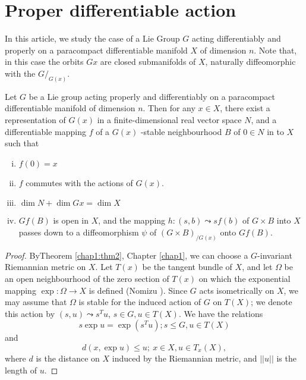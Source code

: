 \section{Proper differentiable action}%
 
In this article, we study the case of  a Lie Group $G$ acting
differentiably and properly on a  paracompact differentiable manifold
$X$ of dimension $n$. Note that, in this case the  orbits $Gx$ are
closed  submanifolds of $X$, naturally diffeomorphic with the $G/_{G
  (x) }$. 

\begin{lem}\label{chap2:lem4}%
  Let $G$ be a Lie group acting properly and differentiably on a
  paracompact differentiable manifold of dimension $n$. Then for any $x \in X
  $, there exist a representation of $G(x)$ in a finite-dimensional real
  vector space $N$, and a differentiable mapping $f$ of a $G (x)$
  -stable neighbourhood $B$ of  $ 0 \in N $ in to $X$ such that  
  \begin{enumerate}[(i)]
  \item $f (0) = x$

  \item $f$ commutes with the actions of $G(x)$.

  \item $\dim N +  \dim  Gx = \dim X$

  \item $ G f (B) $ is open in $X$, and  the mapping $h : (s, b)
    \leadsto  sf (b)$ of  $ G \times B $ into $X$ passes down to  a
    diffeomorphism $\psi$ of $(G \times B)_{/  G (x)}$ onto $G f (B)$. 
  \end{enumerate}  
\end{lem}  
 
\begin{proof}
  By\pageoriginale Theorem \ref{chap1:thm2}, Chapter \ref{chap1}, we
  can choose a $G$-invariant   Riemannian  
  metric on $X$. Let $T(x)$ be the tangent bundle of $X$, and  let
  $\Omega $ be an  open neighbourhood of the zero section of $T(x)$ on
  which the exponential mapping  $ \exp : \Omega \rightarrow  X $  is
  defined  (Nomizu \cite{key1}). Since  $G$ acts  isometrically on  $X$,
  we may assume that $\Omega $ is stable for the induced action of $G$
  on $T(X)$; we denote  this  action by $(s, u) \leadsto s^T u$, $s \in
  G, u \in T( X)$. We have the relations 
  $$
  s \exp u = \exp ( s^T u );  s \leq G,  u \in T(X) 
  $$ 
    and
  $$
  d(x, \exp  u ) \leq u ;  ~ x \in X, u \in T_x (X), 
  $$
  where $d$ is the distance on $X$ induced by the Riemannian metric, and
  $|| u ||$ is the  length of $u$. 
\end{proof}   
    
